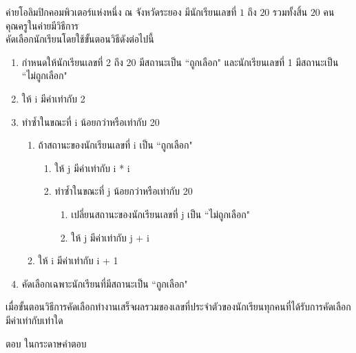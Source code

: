 \question ค่ายโอลิมปิกคอมพิวเตอร์แห่งหนึ่ง ณ จังหวัดระยอง มีนักเรียนเลขที่ $1$ ถึง $20$ รวมทั้งสิ้น $20$ คน คุณครูในค่ายมีวิธีการ\\
คัดเลือกนักเรียนโดยใช้ขั้นตอนวิธีดังต่อไปนี้
\begin{pseudocode}
\begin{enumerate}
    \item กำหนดให้นักเรียนเลขที่ 2 ถึง 20 มีสถานะเป็น ``ถูกเลือก" และนักเรียนเลขที่ 1 มีสถานะเป็น ``ไม่ถูกเลือก"
    \item ให้ i มีค่าเท่ากับ 2
    \item ทำซ้ำในขณะที่ i น้อยกว่าหรือเท่ากับ 20
        \begin{enumerate}
            \item ถ้าสถานะของนักเรียนเลขที่ i เป็น ``ถูกเลือก"
                \begin{enumerate}
                    \item ให้ j มีค่าเท่ากับ i * i
                    \item ทำซ้ำในขณะที่ j น้อยกว่าหรือเท่ากับ 20
                        \begin{enumerate}
                            \item เปลี่ยนสถานะของนักเรียนเลขที่ j เป็น ``ไม่ถูกเลือก"
                            \item ให้ j มีค่าเท่ากับ j + i
                        \end{enumerate}
                \end{enumerate}
            \item ให้ i มีค่าเท่ากับ i + 1
        \end{enumerate}
    \item คัดเลือกเฉพาะนักเรียนที่มีสถานะเป็น ``ถูกเลือก"
\end{enumerate}
\end{pseudocode}
\medskip
เมื่อขั้นตอนวิธีการคัดเลือกทำงานเสร็จผลรวมของเลขที่ประจำตัวของนักเรียนทุกคนที่ได้รับการคัดเลือกมีค่าเท่ากับเท่าใด

\par\medskip
ตอบ ในกระดาษคำตอบ
